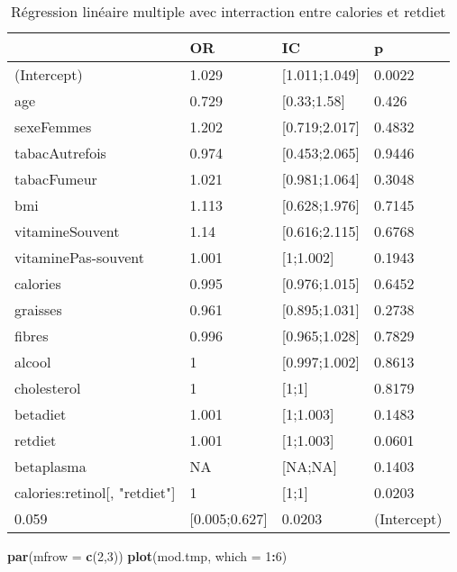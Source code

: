 \documentclass[]{article}
\newenvironment{Shaded}{\begin{snugshade}}{\end{snugshade}}
\newcommand{\KeywordTok}[1]{\textcolor[rgb]{0.13,0.29,0.53}{\textbf{#1}}}
\newcommand{\DataTypeTok}[1]{\textcolor[rgb]{0.13,0.29,0.53}{#1}}
\newcommand{\DecValTok}[1]{\textcolor[rgb]{0.00,0.00,0.81}{#1}}
\newcommand{\OperatorTok}[1]{\textcolor[rgb]{0.81,0.36,0.00}{\textbf{#1}}}
\newcommand{\NormalTok}[1]{#1}
\begin{document}
\begin{table}

\caption{\label{tab:unnamed-chunk-88}Régression linéaire multiple avec interraction entre calories et retdiet}
\centering
\begin{tabular}[t]{l|l|l|l}
\hline
  & OR & IC & p\\
\hline
\rowcolor[HTML]{BBD2E1}  (Intercept) & 1.029 & [1.011;1.049] & 0.0022\\
\hline
age & 0.729 & [0.33;1.58] & 0.426\\
\hline
\rowcolor[HTML]{BBD2E1}  sexeFemmes & 1.202 & [0.719;2.017] & 0.4832\\
\hline
tabacAutrefois & 0.974 & [0.453;2.065] & 0.9446\\
\hline
\rowcolor[HTML]{BBD2E1}  tabacFumeur & 1.021 & [0.981;1.064] & 0.3048\\
\hline
bmi & 1.113 & [0.628;1.976] & 0.7145\\
\hline
\rowcolor[HTML]{BBD2E1}  vitamineSouvent & 1.14 & [0.616;2.115] & 0.6768\\
\hline
vitaminePas-souvent & 1.001 & [1;1.002] & 0.1943\\
\hline
\rowcolor[HTML]{BBD2E1}  calories & 0.995 & [0.976;1.015] & 0.6452\\
\hline
graisses & 0.961 & [0.895;1.031] & 0.2738\\
\hline
\rowcolor[HTML]{BBD2E1}  fibres & 0.996 & [0.965;1.028] & 0.7829\\
\hline
alcool & 1 & [0.997;1.002] & 0.8613\\
\hline
\rowcolor[HTML]{BBD2E1}  cholesterol & 1 & [1;1] & 0.8179\\
\hline
betadiet & 1.001 & [1;1.003] & 0.1483\\
\hline
\rowcolor[HTML]{BBD2E1}  retdiet & 1.001 & [1;1.003] & 0.0601\\
\hline
betaplasma & NA & [NA;NA] & 0.1403\\
\hline
\rowcolor[HTML]{BBD2E1}  calories:retinol[, "retdiet"] & 1 & [1;1] & 0.0203\\
\hline
0.059 & [0.005;0.627] & 0.0203 & (Intercept)\\
\hline
\end{tabular}
\end{table}

\begin{Shaded}
\begin{Highlighting}[]
\KeywordTok{par}\NormalTok{(}\DataTypeTok{mfrow =} \KeywordTok{c}\NormalTok{(}\DecValTok{2}\NormalTok{,}\DecValTok{3}\NormalTok{))}
\KeywordTok{plot}\NormalTok{(mod.tmp, }\DataTypeTok{which =} \DecValTok{1}\OperatorTok{:}\DecValTok{6}\NormalTok{)}
\end{Highlighting}
\end{Shaded}
\end{document}
